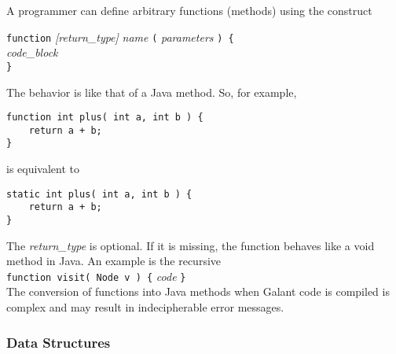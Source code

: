 A programmer can define arbitrary functions (methods) using the construct

\texttt{function} \textsl{[return\_type]} \textsl{name} \texttt{(}
 \textsl{parameters} \texttt{) \{} \\
 \hspace*{3em} \textsl{code\_block} \\
 \texttt{\}}

The behavior is like that of a Java method. So, for example,
\begin{verbatim}
function int plus( int a, int b ) {
    return a + b;
}
\end{verbatim}
is equivalent to
\begin{verbatim}
static int plus( int a, int b ) {
    return a + b;
}
\end{verbatim}

The \textsl{return\_type} is optional. If it is missing, the function behaves like
a \textsf{void} method in Java. An example is the recursive
\\
\texttt{function visit( Node v ) \{} \textsl{code} \texttt{\}}
\\
The conversion of functions into Java methods when Galant code is compiled
is complex and may result in indecipherable error messages.

\subsubsection*{Data Structures}

